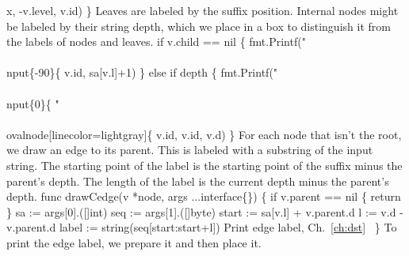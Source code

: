                   x, -v.level, v.id)
\}
\nwendcode{}\nwdocspar
Leaves are labeled by the suffix position. Internal nodes might be
labeled by their string depth, which we place in a box to distinguish
it from the labels of nodes and leaves.
\nwenddocs{}\endmoddef\nwstartdeflinemarkup{}\nwenddeflinemarkup
if v.child == nil \{
          fmt.Printf("\\\\nput\{-90\}\{%
                  v.id, sa[v.l]+1)
\} else if depth \{
          fmt.Printf("\\\\nput\{0\}\{%
                  "\\\\ovalnode[linecolor=lightgray]\{%
                  v.id, v.id, v.d)
\}
\nwendcode{}\nwdocspar
For each node that isn't the root, we draw an edge to its parent. This
is labeled with a substring of the input string. The starting point of
the label is the starting point of the suffix minus the parent's
depth. The length of the label is the current depth minus the parent's
depth.
\nwenddocs{}\plusendmoddef\nwstartdeflinemarkup{}\nwenddeflinemarkup
func drawCedge(v *node, args ...interface\{\}) \{
          if v.parent == nil \{ return \}
          sa := args[0].([]int)
          seq := args[1].([]byte)
          start := sa[v.l] + v.parent.d
          l := v.d - v.parent.d
          label := string(seq[start:start+l])
          \LA{}Print edge label, Ch.~\ref{ch:dst}~{\nwtagstyle{}}\RA{}
\}
\nwendcode{}\nwdocspar
To print the edge label, we prepare it and then place it.
\nwenddocs{}\endmoddef\nwstartdeflinemarkup{}\nwenddeflinemarkup
